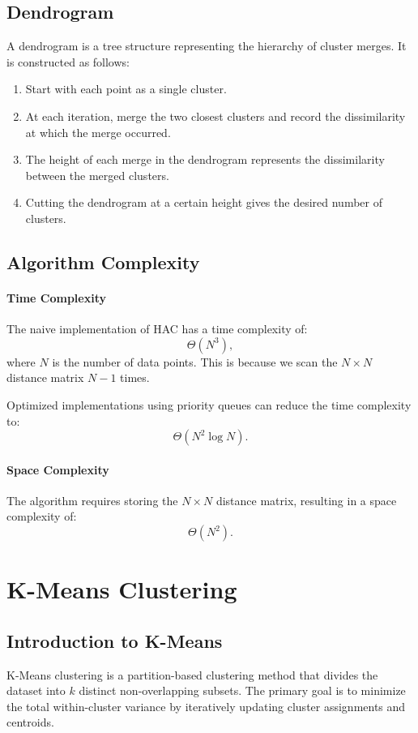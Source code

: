 \documentclass[12pt,a4paper]{article}
\begin{document}
\subsection{Dendrogram}
A dendrogram is a tree structure representing the hierarchy of cluster merges. It is constructed as follows:
\begin{enumerate}
    \item Start with each point as a single cluster.
    \item At each iteration, merge the two closest clusters and record the dissimilarity at which the merge occurred.
    \item The height of each merge in the dendrogram represents the dissimilarity between the merged clusters.
    \item Cutting the dendrogram at a certain height gives the desired number of clusters.
\end{enumerate}

\subsection{Algorithm Complexity}
\paragraph{Time Complexity}
The naive implementation of HAC has a time complexity of:
\[
\Theta(N^3),
\]
where $N$ is the number of data points. This is because we scan the $N \times N$ distance matrix $N-1$ times.

Optimized implementations using priority queues can reduce the time complexity to:
\[
\Theta(N^2 \log N).
\]

\paragraph{Space Complexity}
The algorithm requires storing the $N \times N$ distance matrix, resulting in a space complexity of:
\[
\Theta(N^2).
\]


\section{K-Means Clustering}

\subsection{Introduction to K-Means}
K-Means clustering is a partition-based clustering method that divides the dataset into \(k\) distinct non-overlapping subsets. The primary goal is to minimize the total within-cluster variance by iteratively updating cluster assignments and centroids.
\end{document}
